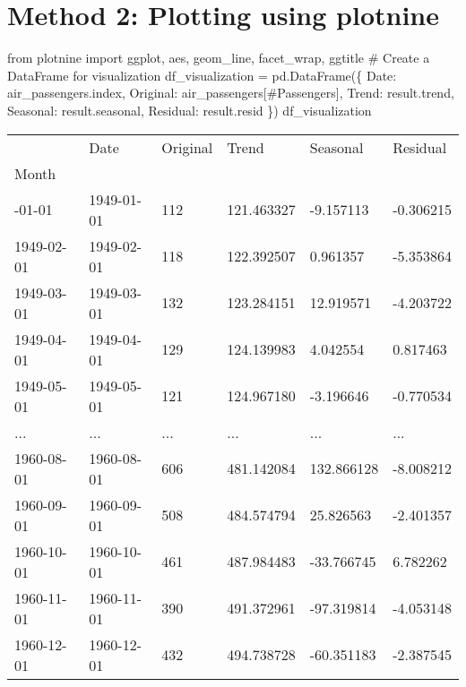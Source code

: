 \documentclass[
  letterpaper,
  DIV=11,
  numbers=noendperiod]{scrreprt}
\newenvironment{Shaded}{\begin{snugshade}}{\end{snugshade}}
\newcommand{\CommentTok}[1]{\textcolor[rgb]{0.37,0.37,0.37}{#1}}
\newcommand{\ImportTok}[1]{\textcolor[rgb]{0.00,0.46,0.62}{#1}}
\newcommand{\NormalTok}[1]{\textcolor[rgb]{0.00,0.23,0.31}{#1}}
\newcommand{\OperatorTok}[1]{\textcolor[rgb]{0.37,0.37,0.37}{#1}}
\newcommand{\StringTok}[1]{\textcolor[rgb]{0.13,0.47,0.30}{#1}}
\begin{document}
\hypertarget{method-2-plotting-using-plotnine}{%
\section{Method 2: Plotting using
plotnine}\label{method-2-plotting-using-plotnine}}

\begin{Shaded}
\begin{Highlighting}[]
\ImportTok{from}\NormalTok{ plotnine }\ImportTok{import}\NormalTok{ ggplot, aes, geom\_line, facet\_wrap, ggtitle}
\CommentTok{\# Create a DataFrame for visualization}
\NormalTok{df\_visualization }\OperatorTok{=}\NormalTok{ pd.DataFrame(\{}
    \StringTok{\textquotesingle{}Date\textquotesingle{}}\NormalTok{: air\_passengers.index,}
    \StringTok{\textquotesingle{}Original\textquotesingle{}}\NormalTok{: air\_passengers[}\StringTok{\textquotesingle{}\#Passengers\textquotesingle{}}\NormalTok{],}
    \StringTok{\textquotesingle{}Trend\textquotesingle{}}\NormalTok{: result.trend,}
    \StringTok{\textquotesingle{}Seasonal\textquotesingle{}}\NormalTok{: result.seasonal,}
    \StringTok{\textquotesingle{}Residual\textquotesingle{}}\NormalTok{: result.resid}
\NormalTok{\})}
\NormalTok{df\_visualization}
\end{Highlighting}
\end{Shaded}

\begin{longtable}[]{@{}llllll@{}}
\toprule\noalign{}
& Date & Original & Trend & Seasonal & Residual \\
Month & & & & & \\
\midrule\noalign{}
\endhead
\bottomrule\noalign{}
\endlastfoot
1949-01-01 & 1949-01-01 & 112 & 121.463327 & -9.157113 & -0.306215 \\
1949-02-01 & 1949-02-01 & 118 & 122.392507 & 0.961357 & -5.353864 \\
1949-03-01 & 1949-03-01 & 132 & 123.284151 & 12.919571 & -4.203722 \\
1949-04-01 & 1949-04-01 & 129 & 124.139983 & 4.042554 & 0.817463 \\
1949-05-01 & 1949-05-01 & 121 & 124.967180 & -3.196646 & -0.770534 \\
... & ... & ... & ... & ... & ... \\
1960-08-01 & 1960-08-01 & 606 & 481.142084 & 132.866128 & -8.008212 \\
1960-09-01 & 1960-09-01 & 508 & 484.574794 & 25.826563 & -2.401357 \\
1960-10-01 & 1960-10-01 & 461 & 487.984483 & -33.766745 & 6.782262 \\
1960-11-01 & 1960-11-01 & 390 & 491.372961 & -97.319814 & -4.053148 \\
1960-12-01 & 1960-12-01 & 432 & 494.738728 & -60.351183 & -2.387545 \\
\end{longtable}
\end{document}
